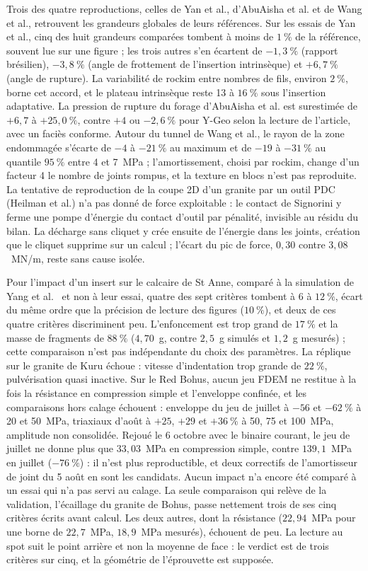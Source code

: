 Trois des quatre reproductions, celles de Yan et al., d'AbuAisha et al. et de Wang et al., retrouvent les grandeurs globales de leurs références. Sur les essais de Yan et al., cinq des huit grandeurs comparées tombent à moins de $1~\%$ de la référence, souvent lue sur une figure ; les trois autres s'en écartent de $-1{,}3~\%$ (rapport brésilien), $-3{,}8~\%$ (angle de frottement de l'insertion intrinsèque) et $+6{,}7~\%$ (angle de rupture). La variabilité de rockim entre nombres de fils, environ $2~\%$, borne cet accord, et le plateau intrinsèque reste 13 à $16~\%$ sous l'insertion adaptative. La pression de rupture du forage d'AbuAisha et al. est surestimée de $+6{,}7$ à $+25{,}0~\%$, contre $+4$ ou $-2{,}6~\%$ pour Y-Geo selon la lecture de l'article, avec un faciès conforme. Autour du tunnel de Wang et al., le rayon de la zone endommagée s'écarte de $-4$ à $-21~\%$ au maximum et de $-19$ à $-31~\%$ au quantile $95~\%$ entre 4 et 7~MPa ; l'amortissement, choisi par rockim, change d'un facteur 4 le nombre de joints rompus, et la texture en blocs n'est pas reproduite. La tentative de reproduction de la coupe 2D d'un granite par un outil PDC (Heilman et al.) n'a pas donné de force exploitable : le contact de Signorini y ferme une pompe d'énergie du contact d'outil par pénalité, invisible au résidu du bilan. La décharge  sans cliquet y crée ensuite de l'énergie dans les joints, création que le cliquet supprime sur un calcul ; l'écart du pic de force, $0{,}30$ contre $3{,}08$~MN/m, reste sans cause isolée.

Pour l'impact d'un insert sur le calcaire de St Anne, comparé à la simulation de Yang et al.~\cite{yang2025validation} et non à leur essai, quatre des sept critères tombent à 6 à $12~\%$, écart du même ordre que la précision de lecture des figures ($10~\%$), et deux de ces quatre critères discriminent peu. L'enfoncement est trop grand de $17~\%$ et la masse de fragments de $88~\%$ ($4{,}70$~g, contre $2{,}5$~g simulés et $1{,}2$~g mesurés) ; cette comparaison n'est pas indépendante du choix des paramètres. La réplique sur le granite de Kuru échoue : vitesse d'indentation trop grande de $22~\%$, pulvérisation quasi inactive. Sur le Red Bohus, aucun jeu FDEM ne restitue à la fois la résistance en compression simple et l'enveloppe confinée, et les comparaisons hors calage échouent : enveloppe du jeu de juillet à $-56$ et $-62~\%$ à 20 et 50~MPa, triaxiaux d'août à $+25$, $+29$ et $+36~\%$ à 50, 75 et 100~MPa, amplitude non consolidée. Rejoué le 6 octobre avec le binaire courant, le jeu de juillet ne donne plus que $33{,}03$~MPa en compression simple, contre $139{,}1$~MPa en juillet ($-76~\%$) : il n'est plus reproductible, et deux correctifs de l'amortisseur de joint du 5 août en sont les candidats. Aucun impact n'a encore été comparé à un essai qui n'a pas servi au calage. La seule comparaison qui relève de la validation, l'écaillage du granite de Bohus, passe nettement trois de ses cinq critères écrits avant calcul. Les deux autres, dont la résistance ($22{,}94$~MPa pour une borne de $22{,}7$~MPa, $18{,}9$~MPa mesurés), échouent de peu. La lecture au spot suit le point arrière et non la moyenne de face : le verdict est de trois critères sur cinq, et la géométrie de l'éprouvette est supposée.


